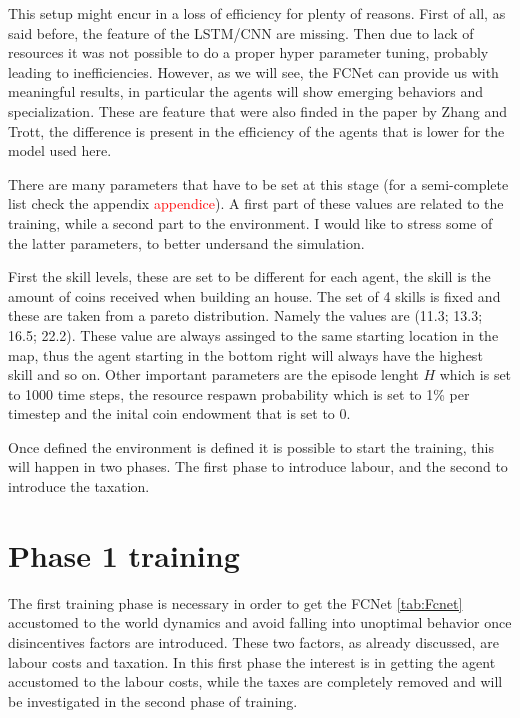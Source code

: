 This setup might encur in a loss of efficiency for plenty of reasons. First of all, as said before, the feature of the LSTM/CNN are missing. Then due to lack of resources it was not possible to do a proper hyper parameter tuning, probably leading to inefficiencies. However, as we will see, the FCNet can provide us with meaningful results, in particular the agents will show emerging behaviors and specialization. These are feature that were also finded in the paper by Zhang and Trott, the difference is present in the efficiency of the agents that is lower for the model used here.

There are many parameters that have to be set at this stage (for a semi-complete list check the appendix \textcolor{red}{appendice}). A first part of these values are related to the training, while a second part to the environment. I would like to stress some of the latter parameters, to better undersand the simulation.

First the skill levels, these are set to be different for each agent, the skill is the amount of coins received when building an house. The set of 4 skills is fixed and these are taken from a pareto distribution. Namely the values are (11.3; 13.3; 16.5; 22.2). These value are always assinged to the same starting location in the map, thus the agent starting in the bottom right will always have the highest skill and so on. Other important parameters are the episode lenght \( H \) which is set to 1000 time steps, the resource respawn probability which is set to 1\% per timestep and the inital coin endowment that is set to 0.

Once defined the environment is defined it is possible to start the training, this will happen in two phases. The first phase to introduce labour, and the second to introduce the taxation.

\section{Phase 1 training}

The first training phase is necessary in order to get the FCNet \ref{tab:Fcnet} accustomed to the world dynamics and avoid falling into unoptimal behavior once disincentives factors are introduced. These two factors, as already discussed, are labour costs and taxation. In this first phase the interest is in getting the agent accustomed to the labour costs, while the taxes are completely removed and will be investigated in the second phase of training. 


